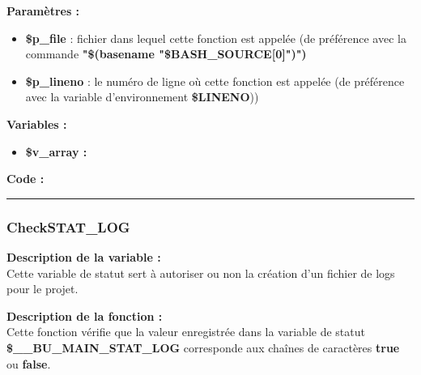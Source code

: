 \documentclass[a4paper,10pt]{article}
\begin{document}
\begin{justify}
    \textbf{Paramètres :}

    \begin{itemize}
        \item \color{orange}\textbf{\$p\_file}\color{white} : fichier dans lequel cette fonction est appelée (de préférence avec la commande \textbf{"\$(\color{gray}basename \color{white}"\color{orange}\$BASH\_SOURCE[0]\color{white}")")}\\

        \item \color{orange}\textbf{\$p\_lineno}\color{white} : le numéro de ligne où cette fonction est appelée (de préférence avec la variable d'environnement \textbf{\color{orange}\$LINENO}))
    \end{itemize}
\end{justify}

\begin{justify}
    \textbf{Variables :}

    \begin{itemize}
        \item \textbf{\color{orange}\$v\_array\color{white} :}
    \end{itemize}
\end{justify}

\begin{justify}
    \textbf{Code :}
\end{justify}



\color{blue}\par\noindent\rule{\textwidth}{0.4pt}\color{white}

\color{blue}
\subsubsection{CheckSTAT\_LOG}\color{white}

\begin{justify}
    \textbf{Description de la variable :}\\
    Cette variable de statut sert à autoriser ou non la création d'un fichier de logs pour le projet.
\end{justify}

\begin{justify}
    \textbf{Description de la fonction :}\\
    Cette fonction vérifie que la valeur enregistrée dans la variable de statut \textbf{\color{orange}\$\_\_BU\_MAIN\_STAT\_LOG} corresponde aux chaînes de caractères \textbf{true} ou \textbf{false}.\\[1\baselineskip]
\end{justify}
\end{document}
